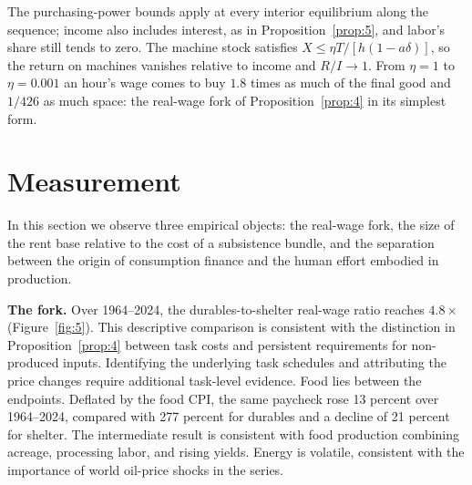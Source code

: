 \documentclass[12pt]{article}
\theoremstyle{plain}
\theoremstyle{definition}
\theoremstyle{remark}
\begin{document}
The purchasing-power bounds apply at every interior equilibrium along the sequence; income also includes interest, as in Proposition~\ref{prop:5}, and labor's share still tends to zero.
The machine stock satisfies $X\le\eta T/[h(1-a\delta)]$, so the return on machines vanishes relative to income and $R/I\to1$. From $\eta=1$ to $\eta=0.001$ an hour's wage comes to buy $1.8$ times as much of the final good and $1/426$ as much space: the real-wage fork of Proposition~\ref{prop:4} in its simplest form.

\section{Measurement}\label{sec:measurement}

In this section we observe three empirical objects: the real-wage fork, the size of the rent base relative to the cost of a subsistence bundle, and the separation between the origin of consumption finance and the human effort embodied in production.

\textbf{The fork.} Over 1964--2024, the durables-to-shelter real-wage ratio reaches $4.8\times$ (Figure~\ref{fig:5}). This descriptive comparison is consistent with the distinction in Proposition~\ref{prop:4} between task costs and persistent requirements for non-produced inputs. Identifying the underlying task schedules and attributing the price changes require additional task-level evidence. Food lies between the endpoints. Deflated by the food CPI, the same paycheck rose 13 percent over 1964--2024, compared with 277 percent for durables and a decline of 21 percent for shelter. The intermediate result is consistent with food production combining acreage, processing labor, and rising yields. Energy is volatile, consistent with the importance of world oil-price shocks in the series.
\end{document}
